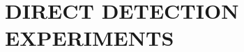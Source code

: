 \documentclass[%
 reprint,
 amsmath,amssymb,
 aps,
]{revtex4-2}
\begin{document}

\section{DIRECT DETECTION EXPERIMENTS}
\label{sec:direct_detection}
\end{document}
